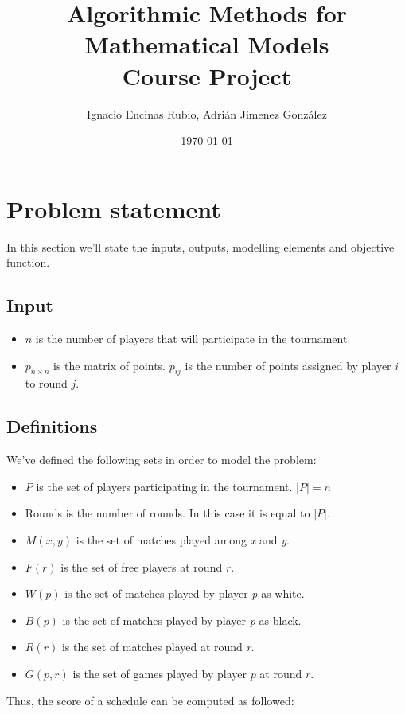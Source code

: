 \documentclass[a4paper, 10pt]{article}
\title{Algorithmic Methods for Mathematical Models\\Course Project}
\author{Ignacio Encinas Rubio, Adrián Jimenez González}
\date{\normalsize\today{}}
\begin{document}
\maketitle

\section{Problem statement}
In this section we'll state the inputs, outputs, modelling elements and objective function.


\subsection{Input}
\begin{itemize}
    \item $n$ is the number of players that will participate in the tournament.
    \item $p_{n \times n}$ is the matrix of points. $p_{ij}$ is the number of points assigned by player $i$ to round $j$.
\end{itemize}

\subsection{Definitions}
We've defined the following sets in order to model the problem:

\begin{itemize}
    \item $P$ is the set of players participating in the tournament. $|P| = n$
    \item Rounds is the number of rounds. In this case it is equal to $|P|$.
    \item $M(x, y)$  is the set of matches played among \textit{x} and \textit{y}.
    \item $F(r)$ is the set of free players at round $r$.
    \item $W(p)$ is the set of matches played by player \textit{p} as white.
    \item $B(p)$ is the set of matches played by player \textit{p} as black.
    \item $R(r)$  is the set of matches played at round \textit{r}.
    \item $G(p,r)$ is the set of games played by player $p$ at round $r$.
\end{itemize}

Thus, the score of a schedule can be computed as followed:
\end{document}
